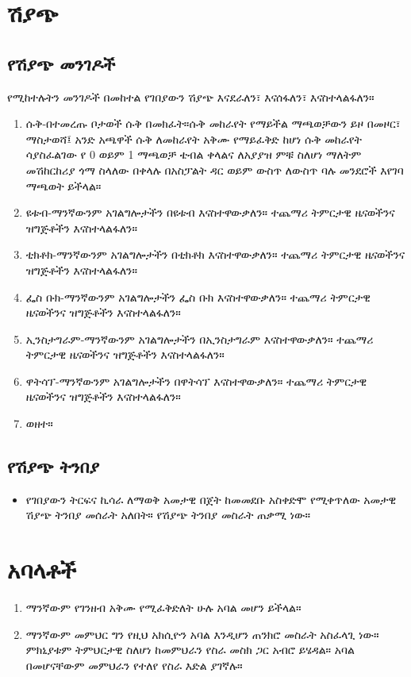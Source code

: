 \documentclass[a4paper,12pt]{article}
\newenvironment{geez}{\geezfont}{}
\begin{document}
\section{\begin{geez}ሽያጭ\end{geez}}
\subsection{\begin{geez}የሽያጭ መንገዶች\end{geez}}  
የሚከተሉትን መንገዶች በመከተል የገበያውን ሽያጭ እናደራለን፣ እናሰፋለን፣ እናስተላልፋለን።
\begin{enumerate}
\item {\color{red}ሱቅ}-በተመረጡ ቦታወች ሱቅ በመክፈት።ሱቅ መከራየት የማይችል ማጫወቻውን ይዞ በመዞር፣ \\
{\color{red}ማስታወሻ}፤ አንድ አጫዋች ሱቅ ለመከራየት አቅሙ የማይፈቅድ ከሆነ ሱቅ መከራየት ሳያስፈልገው የ 0 ወይም 1 ማጫወቻ ቴብል ቀላልና ለአያያዝ ምቹ ስለሆነ ማለትም መሽከርከሪያ ጎማ ስላለው በቀላሉ በአስፓልት ዳር ወይም ውስጥ ለውስጥ ባሉ መንደሮች እየገባ ማጫወት ይችላል።
\item {\color{red}ዩቱብ}-ማንኛውንም አገልግሎታችን በዩቱብ እናስተዋውቃለን። ተጨማሪ ትምርታዊ ዜናወችንና ዝግጅቶችን እናስተላልፋለን።
\item {\color{red}ቲክቶክ}-ማንኛውንም አገልግሎታችን በቲክቶክ እናስተዋውቃለን። ተጨማሪ ትምርታዊ ዜናወችንና ዝግጅቶችን እናስተላልፋለን።
\item {\color{red}ፌስ ቡክ}-ማንኛውንም አገልግሎታችን ፌስ ቡክ እናስተዋውቃለን። ተጨማሪ ትምርታዊ ዜናወችንና ዝግጅቶችን እናስተላልፋለን።
\item {\color{red}ኢንስታግራም}-ማንኛውንም አገልግሎታችን በኢንስታግራም እናስተዋውቃለን። ተጨማሪ ትምርታዊ ዜናወችንና ዝግጅቶችን እናስተላልፋለን።
\item {\color{red}ዋትሳፕ}-ማንኛውንም አገልግሎታችን በዋትሳፕ እናስተዋውቃለን። ተጨማሪ ትምርታዊ ዜናወችንና ዝግጅቶችን እናስተላልፋለን።
\item ወዘተ።
\end{enumerate}
\subsection{\begin{geez}የሽያጭ ትንበያ\end{geez}}  
\begin{itemize}
\item የገበያውን ትርፍና ኪሳራ ለማወቅ አመታዊ በጀት ከመመደቡ አስቀድሞ የሚቀጥለው አመታዊ ሽያጭ ትንበያ መሰራት አለበት። የሽያጭ ትንበያ መስራት ጠቃሚ ነው።
\end{itemize}
\section{\begin{geez}አባላቶች\end{geez}}  
\begin{enumerate}
\item ማንኛውም የገንዘብ አቅሙ የሚፈቅድለት ሁሉ አባል መሆን ይችላል።
\item ማንኛውም መምህር ግን የዚህ አክሲዮን አባል እንዲሆን ጠንክሮ መስራት አስፈላጊ ነው። ምክኒያቱም ትምህርታዊ ስለሆነ ከመምህራን የስራ መስክ ጋር አብሮ ይሄዳል። አባል በመሆናቸውም መምህራን የተለየ የስራ እድል ያገኛሉ።
\end{enumerate}
\end{document}

